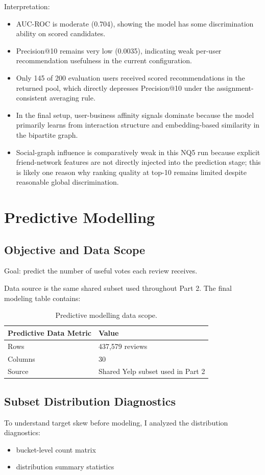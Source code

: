 \documentclass[11pt,a4paper]{article}
\begin{document}
Interpretation:
\begin{itemize}
    \item AUC-ROC is moderate (0.704), showing the model has some discrimination ability on scored candidates.
    \item Precision@10 remains very low (0.0035), indicating weak per-user recommendation usefulness in the current configuration.
    \item Only 145 of 200 evaluation users received scored recommendations in the returned pool, which directly depresses Precision@10 under the assignment-consistent averaging rule.
    \item In the final setup, user-business affinity signals dominate because the model primarily learns from interaction structure and embedding-based similarity in the bipartite graph.
    \item Social-graph influence is comparatively weak in this NQ5 run because explicit friend-network features are not directly injected into the prediction stage; this is likely one reason why ranking quality at top-10 remains limited despite reasonable global discrimination.
\end{itemize}

\section{Predictive Modelling}

\subsection*{Objective and Data Scope}
Goal: predict the number of useful votes each review receives.

Data source is the same shared subset used throughout Part 2. The final modeling table contains:
\begin{table}[H]
\centering
\small
\begin{tabular}{ll}
\toprule
\textbf{Predictive Data Metric} & \textbf{Value} \\
\midrule
Rows & 437,579 reviews \\
Columns & 30 \\
Source & Shared Yelp subset used in Part 2 \\
\bottomrule
\end{tabular}
\caption{Predictive modelling data scope.}
\end{table}

\subsection*{Subset Distribution Diagnostics}
To understand target skew before modeling, I analyzed the distribution diagnostics:
\begin{itemize}
    \item bucket-level count matrix
    \item distribution summary statistics
\end{itemize}
\end{document}
